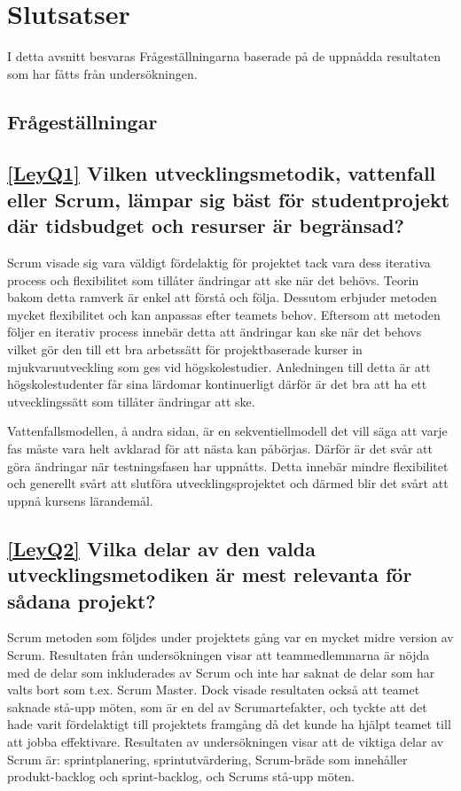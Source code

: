 \section{Slutsatser}
\label{sec:Lieth_Wahid-conclusion}
I detta avsnitt besvaras Frågeställningarna baserade på de uppnådda resultaten som har fåtts från undersökningen.
\subsection{Frågeställningar}

\subsection*{\ref{LeyQ1} Vilken utvecklingsmetodik, vattenfall eller Scrum, lämpar sig bäst för studentprojekt där tidsbudget och resurser är begränsad?}
Scrum visade sig vara väldigt fördelaktig för projektet tack vara dess iterativa process och flexibilitet som tillåter ändringar att ske när det behövs. Teorin bakom detta ramverk är enkel att förstå och följa. Dessutom erbjuder metoden mycket flexibilitet och kan anpassas efter teamets behov. Eftersom att metoden följer en iterativ process innebär detta att ändringar kan ske när det behovs vilket gör den till ett bra arbetssätt för projektbaserade kurser in mjukvaruutveckling som ges vid högskolestudier. Anledningen till detta är att högskolestudenter får sina lärdomar kontinuerligt därför är det bra att ha ett utvecklingssätt som tillåter ändringar att ske.
	
Vattenfallsmodellen, å andra sidan, är en sekventiellmodell det vill säga att varje fas måste vara helt avklarad för att nästa kan påbörjas. Därför är det svår att göra ändringar när testningsfasen har uppnåtts. Detta innebär mindre flexibilitet och generellt svårt att slutföra utvecklingsprojektet och därmed blir det svårt att uppnå kursens lärandemål.
		
\subsection*{\ref{LeyQ2} Vilka delar av den valda utvecklingsmetodiken är mest relevanta för sådana projekt? }
Scrum metoden som följdes under projektets gång var en mycket midre version av Scrum. Resultaten från undersökningen visar att teammedlemmarna är nöjda med de delar som inkluderades av Scrum och inte har saknat de delar som har valts bort som t.ex. Scrum Master. Dock visade resultaten också att teamet saknade stå-upp möten, som är en del av Scrumartefakter, och tyckte att det hade varit fördelaktigt till projektets framgång då det kunde ha hjälpt teamet till att jobba effektivare. Resultaten av undersökningen visar att de viktiga delar av Scrum är: sprintplanering, sprintutvärdering, Scrum-bräde som innehåller produkt-backlog och sprint-backlog, och Scrums stå-upp möten.